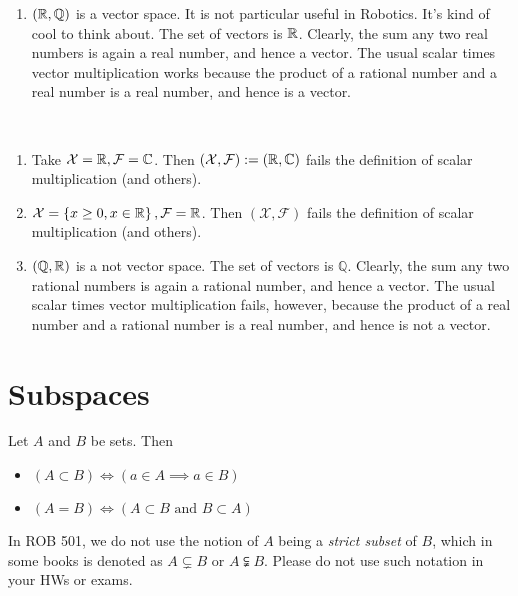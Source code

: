 \begin{example}
\begin{enumerate}
        \item $(\mathbb R,\mathbb{Q})$ is a vector space. It is not particular useful in Robotics. It's kind of cool to think about. The set of vectors is $\mathbb R$. Clearly, the sum any two real numbers is again a real number, and hence a vector. The usual scalar times vector multiplication works because the product of a rational number and a real number is a real number, and hence is a vector. 
    \end{enumerate}
    \end{example}

\vspace*{.2cm}

    \begin{nonexample} \mbox{ }
    \begin{enumerate}
        \item Take $ \mathcal{X} = \mathbb R, \mathcal{F} = \mathbb C$. Then $(\mathcal{X}, \mathcal{F}):=\left(\mathbb R,\mathbb C\right) $ fails the definition of scalar multiplication (and others).
        \item $ \mathcal{X} = \left\{x\geq 0,x\in\mathbb R\right\}, \mathcal{F} = \mathbb R $. Then  $(\mathcal{X}, \mathcal{F})$ fails the definition of scalar multiplication (and others).
        
        \item $(\mathbb{Q}, \mathbb R)$ is a not vector space. The set of vectors is $\mathbb{Q}$. Clearly, the sum any two rational numbers is again a rational number, and hence a vector. The usual scalar times vector multiplication fails, however,  because the product of a real number and a rational number is a real number, and hence is not a vector.
        
    \end{enumerate}
        
\end{nonexample}

\vspace*{.2cm}

\section{Subspaces}

\begin{notation}
 Let $A$ and $B$ be sets. Then 
\begin{itemize}
    \item $(A \subset B) \iff (a\in A \implies a \in B)$
    \item $(A = B) \iff (A \subset B \text{ and } B \subset A)$
\end{itemize}
\end{notation}
In ROB 501, we do not use the notion of $A$ being a \emph{strict subset} of $B$, which in some books is denoted as $A \subsetneq B$ or $A \subsetneqq B$. Please do not use such notation in your HWs or exams. \\

